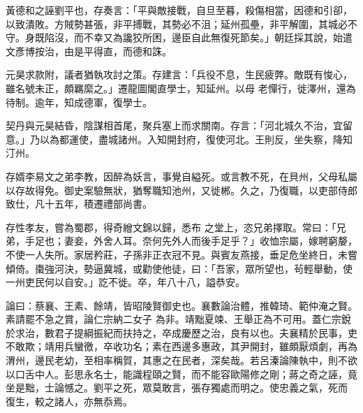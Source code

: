 \begin{pinyinscope}
 黃德和之誣劉平也，存奏言：「平與敵接戰，自旦至暮，殺傷相當，因德和引卻，以致潰敗。方賊勢甚張，非平搏戰，其勢必不沮；延州孤壘，非平解圍，其城必不守。身既陷沒，而不幸又為讒狡所困，邊臣自此無復死節矣。」朝廷採其說，始遣文彥博按治，由是平得直，而德和誅。



 元昊求款附，議者猶執攻討之策。存建言：「兵役不息，生民疲弊。敵既有悛心，雖名號未正，頗羈縻之。」遷龍圖閣直學士，知延州。以母
 老憚行，徙澤州，還為待制。逾年，知成德軍，復學士。



 契丹與元昊結昏，陰謀相首尾，聚兵塞上而求關南。存言：「河北城久不治，宜留意。」乃以為都運使，盡城諸州。入知開封府，復使河北。王則反，坐失察，降知汀州。



 存婿李易文之弟李教，因醉為妖言，事覺自縊死。或言教不死，在貝州，父母私屬以存故得免。御史案驗無狀，猶奪職知池州，又徙郴。久之，乃復職，以吏部侍郎致仕，凡十五年，積遷禮部尚書。



 存性孝友，嘗為蜀郡，得奇繒文錦以歸，悉布
 之堂上，恣兄弟擇取。常曰：「兄弟，手足也；妻妾，外舍人耳。奈何先外人而後手足乎？」收恤宗屬，嫁聘窮嫠，不使一人失所。家居矜莊，子孫非正衣冠不見。與賓友燕接，垂足危坐終日，未嘗傾倚。棗強河決，勢逼冀城，或勸使他徒，曰：「吾家，眾所望也，茍輕舉動，使一州吏民何以自安。」訖不徙。卒，年八十八，謚恭安。



 論曰：蔡襄、王素、餘靖，皆昭陵賢御史也。襄數論治體，推韓琦、範仲淹之賢。素請罷不急之賞，論仁宗納二女子
 為非。靖黜夏竦、王舉正為不可用。蓋仁宗銳於求治，數君子提綱振紀而扶持之，卒成慶歷之治，良有以也。夫襄精於民事，吏不敢欺；靖用兵蠻徼，卒收功名；素在西邊多惠政，其尹開封，雖頗厭煩劇，再為渭州，邊民老幼，至相率稱賀，其惠之在民者，深矣哉。若呂溱論陳執中，則不欲以口舌中人。彭思永名士，能識程頤之賢，而不能容歐陽修之剛；蔣之奇之誣，竟坐是黜，士論憾之。劉平之死，眾莫敢言，張存獨處而明之。使忠義之氣，死而
 復生，較之諸人，亦無忝焉。



\end{pinyinscope}